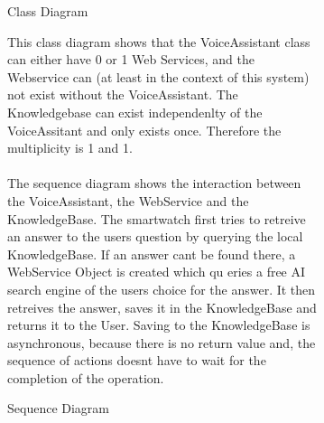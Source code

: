 \documentclass{article}
\begin{document}
		\begin{figure}[htbp]
			\centering
			\begin{subfigure}{\textwidth}
				\centering
				\resizebox{\textwidth}{!}{}
				\caption{Class Diagram}
			\end{subfigure}
			\begin{subfigure}{\textwidth}
				\vspace{1em}
				This class diagram shows that the VoiceAssistant class can either have 0 or 1 Web Services, and the Webservice can (at least in the context of this system)
				not exist without the VoiceAssistant. The Knowledgebase can exist independenlty of the VoiceAssitant and only exists once. Therefore the multiplicity is 1 and 1.
				\\ \\
				The sequence diagram shows the interaction between the VoiceAssistant, the WebService and the KnowledgeBase. 
				The smartwatch first tries to retreive an answer to the users question by querying the local KnowledgeBase.
				If an answer cant be found there, a WebService Object is created which qu eries a free AI search engine of the users choice for the answer.
				It then retreives the answer, saves it in the KnowledgeBase and returns it to the User. Saving to the KnowledgeBase is asynchronous,
				because there is no return value and, the sequence of actions doesnt have to wait for the completion of the operation.
			\end{subfigure}
		\end{figure}
	
		
		\begin{figure}[htbp]
			\centering
			\begin{subfigure}{\textwidth}
				\centering
				
				\caption{Sequence Diagram}
			\end{subfigure}
			\begin{subfigure}{\textwidth}
			
			\end{subfigure}
		\end{figure} 
	
	
	
\end{document}
